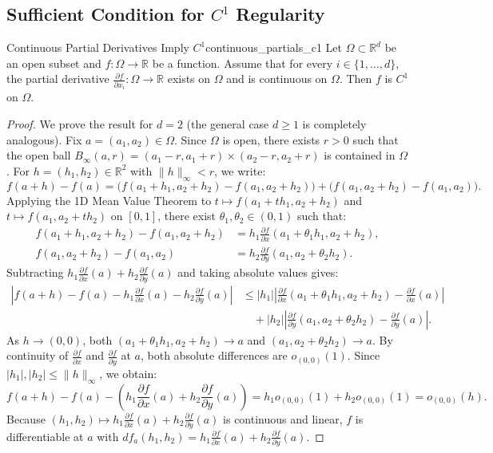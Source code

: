\documentclass[11pt, a4paper]{article}
\newcommand{\R}{\mathbb{R}}
\begin{document}
\subsection{Sufficient Condition for $C^1$ Regularity}
\begin{theorem}{Continuous Partial Derivatives Imply $C^1$}{continuous_partials_c1}
Let $\Omega \subset \R^d$ be an open subset and $f: \Omega \to \R$ be a function. Assume that for every $i \in \{1, \dots, d\}$, the partial derivative $\frac{\partial f}{\partial x_i}: \Omega \to \R$ exists on $\Omega$ and is continuous on $\Omega$. Then $f$ is $C^1$ on $\Omega$.
\end{theorem}
\begin{proof}
We prove the result for $d = 2$ (the general case $d \ge 1$ is completely analogous). Fix $a = (a_1, a_2) \in \Omega$. Since $\Omega$ is open, there exists $r > 0$ such that the open ball $B_\infty(a, r) = (a_1 - r, a_1 + r) \times (a_2 - r, a_2 + r)$ is contained in $\Omega$. For $h = (h_1, h_2) \in \R^2$ with $\|h\|_\infty < r$, we write:
\[
f(a + h) - f(a) = \big(f(a_1 + h_1, a_2 + h_2) - f(a_1, a_2 + h_2)\big) + \big(f(a_1, a_2 + h_2) - f(a_1, a_2)\big).
\]
Applying the 1D Mean Value Theorem to $t \mapsto f(a_1 + t h_1, a_2 + h_2)$ and $t \mapsto f(a_1, a_2 + t h_2)$ on $[0, 1]$, there exist $\theta_1, \theta_2 \in (0, 1)$ such that:
\begin{align*}
f(a_1 + h_1, a_2 + h_2) - f(a_1, a_2 + h_2) &= h_1 \frac{\partial f}{\partial x}(a_1 + \theta_1 h_1, a_2 + h_2), \\
f(a_1, a_2 + h_2) - f(a_1, a_2) &= h_2 \frac{\partial f}{\partial y}(a_1, a_2 + \theta_2 h_2).
\end{align*}
Subtracting $h_1 \frac{\partial f}{\partial x}(a) + h_2 \frac{\partial f}{\partial y}(a)$ and taking absolute values gives:
\begin{align*}
\left| f(a + h) - f(a) - h_1 \frac{\partial f}{\partial x}(a) - h_2 \frac{\partial f}{\partial y}(a) \right| &\le |h_1| \left| \frac{\partial f}{\partial x}(a_1 + \theta_1 h_1, a_2 + h_2) - \frac{\partial f}{\partial x}(a) \right| \\
&\quad + |h_2| \left| \frac{\partial f}{\partial y}(a_1, a_2 + \theta_2 h_2) - \frac{\partial f}{\partial y}(a) \right|.
\end{align*}
As $h \to (0, 0)$, both $(a_1 + \theta_1 h_1, a_2 + h_2) \to a$ and $(a_1, a_2 + \theta_2 h_2) \to a$. By continuity of $\frac{\partial f}{\partial x}$ and $\frac{\partial f}{\partial y}$ at $a$, both absolute differences are $o_{(0, 0)}(1)$. Since $|h_1|, |h_2| \le \|h\|_\infty$, we obtain:
\[
f(a + h) - f(a) - \left(h_1 \frac{\partial f}{\partial x}(a) + h_2 \frac{\partial f}{\partial y}(a)\right) = h_1 o_{(0, 0)}(1) + h_2 o_{(0, 0)}(1) = o_{(0, 0)}(h).
\]
Because $(h_1, h_2) \mapsto h_1 \frac{\partial f}{\partial x}(a) + h_2 \frac{\partial f}{\partial y}(a)$ is continuous and linear, $f$ is differentiable at $a$ with $df_a(h_1, h_2) = h_1 \frac{\partial f}{\partial x}(a) + h_2 \frac{\partial f}{\partial y}(a)$.


\end{proof}
\end{document}
